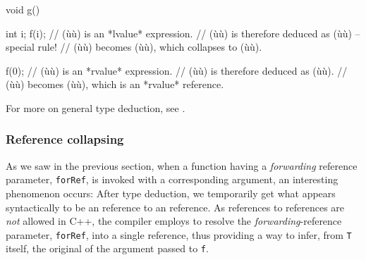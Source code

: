 \begin{emcppslisting}[emcppsbatch=e3]
void g()
{
    int i;
    f(i);  // (ù{}ù) is an *lvalue* expression.
           // (ù{}ù) is therefore deduced as (ù{}ù) -- special rule!
           // (ù{}ù) becomes (ù{}ù), which collapses to (ù{}ù).

    f(0);  // (ù{}ù) is an *rvalue* expression.
           // (ù{}ù) is therefore deduced as (ù{}ù).
           // (ù{}ù) becomes (ù{}ù), which is an *rvalue* reference.
}
\end{emcppslisting}

\noindent For more on general type deduction, see .

\subsubsection[Reference collapsing]{Reference collapsing}\label{reference-collapsing}

As we saw in the previous section, when a function having a
\emph{forwarding} reference parameter, \lstinline!forRef!, is invoked with
a corresponding  argument, an interesting phenomenon
occurs: After type deduction, we temporarily get what appears
syntactically to be an  reference to an 
reference. As references to references are \emph{not} allowed in C++,
the compiler employs  to resolve the
\emph{forwarding}-reference parameter, \lstinline!forRef!, into a single
reference, thus providing a way to infer, from \lstinline!T! itself, the
original  of the argument passed to \lstinline!f!.

